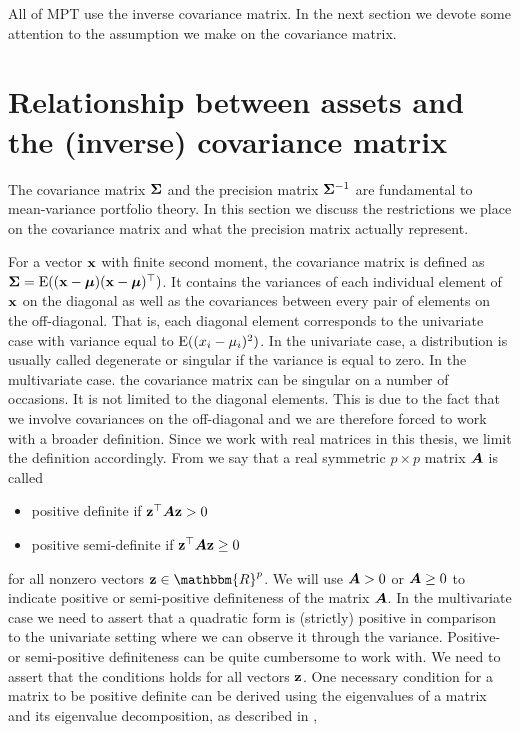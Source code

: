 \documentclass[oneside]{book}\usepackage{knitr}
\begin{document}
All of MPT use the inverse covariance matrix. In the next section we devote some attention to the assumption we make on the covariance matrix.  

\section{Relationship between assets and the (inverse) covariance matrix}\label{subsec:cov_prec_matrix}
The covariance matrix $\mathbf{\Sigma}$ and the precision matrix $\mathbf{\Sigma}^{-1}$ are fundamental to mean-variance portfolio theory. 
In this section we discuss the restrictions we place on the covariance matrix and what the precision matrix actually represent. 

For a vector $\mathbf{x}$ with finite second moment, the covariance matrix is defined as $\mathbf{\Sigma}=\operatorname{E}((\mathbf{x} - \mbox{\boldmath$\mu$})(\mathbf{x} - \mbox{\boldmath$\mu$})^\top)$. 
It contains the variances of each individual element of $\mathbf{x}$ on the diagonal as well as the covariances between every pair of elements on the off-diagonal. 
That is, each diagonal element corresponds to the univariate case with variance equal to $\operatorname{E}((x_i - \mu_i)^2)$. 
In the univariate case, a distribution is usually called degenerate or singular if the variance is equal to zero. 
In the multivariate case. the covariance matrix can be singular on a number of occasions. 
It is not limited to the diagonal elements.
This is due to the fact that we involve covariances on the off-diagonal and we are therefore forced to work with a broader definition.  
Since we work with real matrices in this thesis, we limit the definition accordingly. 
From \textcite[ch 14.2]{harville1997matrix} we say that a real symmetric $p\times p$ matrix $\mbox{\boldmath$A$}$ is called 
\begin{itemize}
	\item positive definite if $\mathbf{z}^\top \mbox{\boldmath$A$} \mathbf{z} > 0$
	\item positive semi-definite if $\mathbf{z}^\top \mbox{\boldmath$A$} \mathbf{z} \geq 0$
\end{itemize}
for all nonzero vectors $\bz \in \mathbbm{R}^p$.
We will use $\mbox{\boldmath$A$} > 0$ or $\mbox{\boldmath$A$} \geq 0$ to indicate positive or semi-positive definiteness of the matrix $\mbox{\boldmath$A$}$. 
In the multivariate case we need to assert that a quadratic form is (strictly) positive in comparison to the univariate setting where we can observe it through the variance. 
Positive- or semi-positive definiteness can be quite cumbersome to work with. 
We need to assert that the conditions holds for all vectors $\mathbf{z}$. 
One necessary condition for a matrix to be positive definite can be derived using the eigenvalues of a matrix and its eigenvalue decomposition, as described in \textcite[ch. 21]{harville1997matrix},
\end{document}
